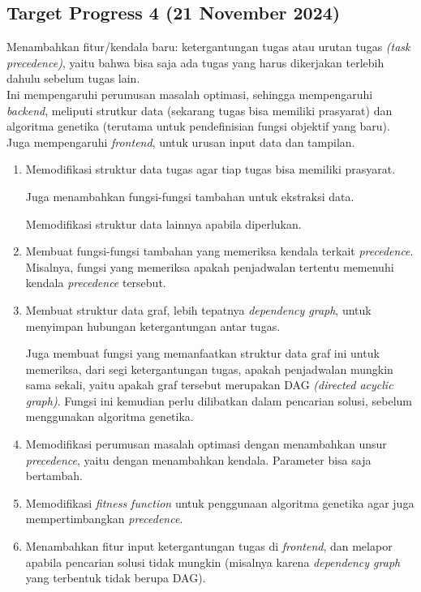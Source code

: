 \documentclass{article}
\begin{document}
\subsection*{Target Progress 4 (21 November 2024)}

Menambahkan fitur/kendala baru: ketergantungan tugas atau urutan tugas \textit{(task precedence)}, yaitu bahwa bisa saja ada tugas yang harus dikerjakan terlebih dahulu sebelum tugas lain. \\[0.5em]
Ini mempengaruhi perumusan masalah optimasi, sehingga mempengaruhi \textit{backend}, meliputi strutkur data (sekarang tugas bisa memiliki prasyarat) dan algoritma genetika (terutama untuk pendefinisian fungsi objektif yang baru). Juga mempengaruhi \textit{frontend}, untuk urusan input data dan tampilan.

\begin{enumerate}
    \item Memodifikasi struktur data tugas agar tiap tugas bisa memiliki prasyarat.
    
    Juga menambahkan fungsi-fungsi tambahan untuk ekstraksi data.
    
    Memodifikasi struktur data lainnya apabila diperlukan.

    \item Membuat fungsi-fungsi tambahan yang memeriksa kendala terkait \textit{precedence}. Misalnya, fungsi yang memeriksa apakah penjadwalan tertentu memenuhi kendala \textit{precedence} tersebut.

    \item Membuat struktur data graf, lebih tepatnya \textit{dependency graph}, untuk menyimpan hubungan ketergantungan antar tugas.
    
    Juga membuat fungsi yang memanfaatkan struktur data graf ini untuk memeriksa, dari segi ketergantungan tugas, apakah penjadwalan mungkin sama sekali, yaitu apakah graf tersebut merupakan DAG \textit{(directed acyclic graph)}. Fungsi ini kemudian perlu dilibatkan dalam pencarian solusi, sebelum menggunakan algoritma genetika.
    
    \item Memodifikasi perumusan masalah optimasi dengan menambahkan unsur \textit{precedence}, yaitu dengan menambahkan kendala. Parameter bisa saja bertambah.
    
    \item Memodifikasi \textit{fitness function} untuk penggunaan algoritma genetika agar juga mempertimbangkan \textit{precedence}.
    
    \item Menambahkan fitur input ketergantungan tugas di \textit{frontend}, dan melapor apabila pencarian solusi tidak mungkin (misalnya karena \textit{dependency graph} yang terbentuk tidak berupa DAG).
\end{enumerate}
\end{document}
